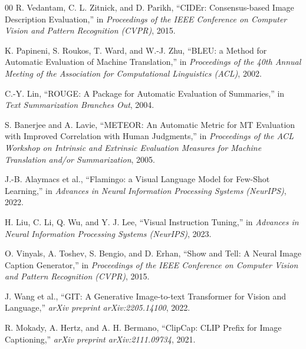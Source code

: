 \documentclass[10pt, conference, compsoc]{IEEEtran}
\begin{document}
\begin{thebibliography}{00}
R. Vedantam, C. L. Zitnick, and D. Parikh, ``CIDEr: Consensus-based Image Description Evaluation,'' in \textit{Proceedings of the IEEE Conference on Computer Vision and Pattern Recognition (CVPR)}, 2015.

K. Papineni, S. Roukos, T. Ward, and W.-J. Zhu, ``BLEU: a Method for Automatic Evaluation of Machine Translation,'' in \textit{Proceedings of the 40th Annual Meeting of the Association for Computational Linguistics (ACL)}, 2002.

C.-Y. Lin, ``ROUGE: A Package for Automatic Evaluation of Summaries,'' in \textit{Text Summarization Branches Out}, 2004.

S. Banerjee and A. Lavie, ``METEOR: An Automatic Metric for MT Evaluation with Improved Correlation with Human Judgments,'' in \textit{Proceedings of the ACL Workshop on Intrinsic and Extrinsic Evaluation Measures for Machine Translation and/or Summarization}, 2005.

J.-B. Alaymacs et al., ``Flamingo: a Visual Language Model for Few-Shot Learning,'' in \textit{Advances in Neural Information Processing Systems (NeurIPS)}, 2022.

H. Liu, C. Li, Q. Wu, and Y. J. Lee, ``Visual Instruction Tuning,'' in \textit{Advances in Neural Information Processing Systems (NeurIPS)}, 2023.

O. Vinyals, A. Toshev, S. Bengio, and D. Erhan, ``Show and Tell: A Neural Image Caption Generator,'' in \textit{Proceedings of the IEEE Conference on Computer Vision and Pattern Recognition (CVPR)}, 2015.

J. Wang et al., ``GIT: A Generative Image-to-text Transformer for Vision and Language,'' \textit{arXiv preprint arXiv:2205.14100}, 2022.

R. Mokady, A. Hertz, and A. H. Bermano, ``ClipCap: CLIP Prefix for Image Captioning,'' \textit{arXiv preprint arXiv:2111.09734}, 2021.

\end{thebibliography}
\end{document}
